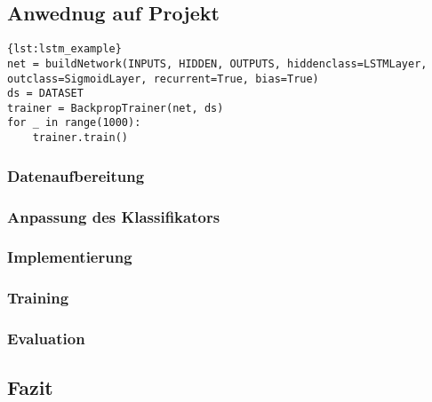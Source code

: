 \subsection{Anwednug auf Projekt}

\cite{schaul2010} 

\begin{lstlisting}[caption={Aufbau eines LSTM Netzes},label={lst:lstm_example}]{lst:lstm_example} 
net = buildNetwork(INPUTS, HIDDEN, OUTPUTS, hiddenclass=LSTMLayer,
outclass=SigmoidLayer, recurrent=True, bias=True) 
ds = DATASET 
trainer = BackpropTrainer(net, ds)
for _ in range(1000):
    trainer.train()
\end{lstlisting}



\subsubsection{Datenaufbereitung}
\label{sec:lstm_data}

\subsubsection{Anpassung des Klassifikators}
\subsubsection{Implementierung}

\subsubsection{Training}

\subsubsection{Evaluation}

\subsection{Fazit}


\nocite{GERS2001,WIKI2013,Schmidhuber2013,LSTM1,Nerbonne1}
